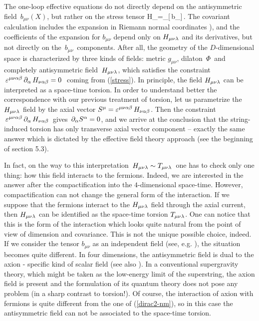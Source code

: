 The one-loop effective equations
do not directly depend on the antisymmetric field $\,b_{\mu\nu}(X)$,
but rather on the stress tensor 
\beq
H_{\mu\nu\la}=\pa_{[\mu}\,b_{\nu\la]}\,.
\label{stress}
\eeq
The covariant calculation 
includes the expansion in Riemann normal coordinates   
\cite{hon,osborn,ketov}), and the coefficients of the 
expansion for $b_{\mu\nu}$ depend only on $H_{\mu\nu\lambda}$
and its derivatives, but not directly on the $\,b_{\mu\nu}\,$
components. 
After all, the geometry of the $D$-dimensional space is
characterized by three kinds of fields: metric $g_{\mu\nu}$,
dilaton $\,\Phi\,$ and completely antisymmetric 
field $\,H_{\mu\nu\lambda}$, which satisfies the constraint 
$\,\varepsilon^{\mu\nu\alpha\beta}\,\partial_\alpha\,H_{\nu\alpha\beta}=0\,\,$ coming 
from (\ref{stress}). In principle, the field $H_{\mu\nu\lambda}$ 
can be interpreted as a space-time torsion. 
In order to understand better the correspondence with our 
previous treatment of torsion, let us parametrize the 
$H_{\mu\nu\lambda}$ field by the axial vector 
$S^\mu = \varepsilon^{\mu\nu\alpha\beta}\,H_{\nu\alpha\beta}$. Then the 
constraint $\,\varepsilon^{\mu\nu\alpha\beta}\,\partial_\alpha\,H_{\nu\alpha\beta}\,$ 
gives $\,\partial_\alpha S^\alpha=0$, and we arrive at the conclusion 
that the string-induced torsion has only transverse 
axial vector component -- exactly the same answer which is 
dictated by the effective 
field theory approach (see the beginning of section 5.3). 

In fact, on the way to this interpretation 
$\,H_{\mu\nu\lambda}\sim T_{\mu\nu\lambda}\,$
one has to check only one thing: how 
this field interacts to the fermions. Indeed, we are
interested in the answer after the
compactification into the $4$-dimensional space-time.
However, compactification can not change the general form 
of the interaction. If we suppose that the fermions interact 
to the 
$H_{\mu\nu\lambda}$ field through the axial current, then 
$H_{\mu\nu\lambda}$ can be identified as the space-time torsion 
$T_{\mu\nu\lambda}$. One can notice that this is the form of 
the interaction which looks quite natural from the point of 
view of dimension and covariance. 
This is not the unique possible choice, indeed. If we 
consider the tensor $b_{\mu\nu}$ as an independent field
(see, e.g. \cite{soeg}), the 
situation becomes quite different. In four dimensions, 
the antisymmetric field is dual to the axion - specific 
kind of scalar field \cite{ogpolu} (see also \cite{book}). 
In a conventional supergravity theory, which might be 
taken as the low-energy limit of the superstring, the axion 
field is present and 
the formulation of its quantum theory does not pose any 
problem (in a sharp contrast to torsion!). 
Of course, the interaction of axion with fermions
is quite different from the one of (\ref{dirac2-nm}), so 
in this case the antisymmetric field can not be associated 
to the space-time torsion. 

